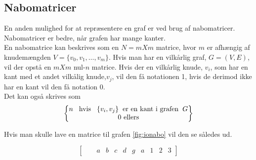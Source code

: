 \subsection{Nabomatricer}
En anden mulighed for at repræsentere en graf er ved brug af nabomatricer. Nabomatricer er bedre, når grafen har mange kanter.\\
En nabomatrice kan beskrives som en $N=m X m$ matrice, hvor $m$ er afhængig af knudemængden $V=\{v_0, v_1, \ldots, v_m\}$. Hvis man har en vilkårlig graf, $G=(V,E)$, vil der opstå en $m X m$ nul-$n$ matrice. Hvis der en vilkårlig knude, $v_i$, som har en kant med et andet vilkålig knude,$v_j$, vil den få notationen 1, hvis de derimod ikke har en kant vil den få notation 0. \\

Det kan også skrives som \\

\begin{equation}
\begin{Bmatrix} 
	 n \hspace{0.3cm}\textrm{hvis} \hspace{0.3cm}\{v_i,v_j\} \hspace{0.2cm} \textrm{er en kant i grafen} \hspace{0.2cm} G \\
	 \textrm{0 ellers} \\
	\end{Bmatrix}
\end{equation}

Hvis man skulle lave en matrice til grafen \ref{fig:ionabo} vil den se således ud.

\begin{equation}
	\begin{bmatrix}
	& & a&b&c&d&g
	&a&1&2&3
	\end{bmatrix} 
\end{equation}
	

